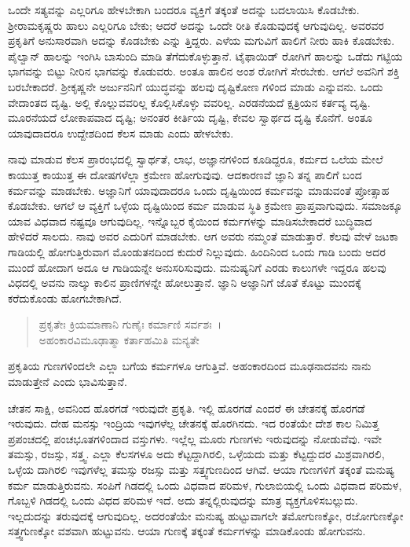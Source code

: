 ಒಂದೇ ಸತ್ಯವನ್ನು ಎಲ್ಲರಿಗೂ ಹೇಳಬೇಕಾಗಿ ಬಂದರೂ ವ್ಯಕ್ತಿಗೆ ತಕ್ಕಂತೆ ಅದನ್ನು ಬದಲಾಯಿಸಿ ಕೊಡಬೇಕು. ಶ‍್ರೀರಾಮಕೃಷ್ಣರು ಹಾಲು ಎಲ್ಲರಿಗೂ ಬೇಕು; ಆದರೆ ಅದನ್ನು ಒಂದೇ ರೀತಿ ಕೊಡುವುದಕ್ಕೆ ಆಗುವುದಿಲ್ಲ. ಅವರವರ ಪ್ರಕೃತಿಗೆ ಅನುಸಾರವಾಗಿ ಅದನ್ನು ಕೊಡಬೇಕು ಎನ್ನು ತ್ತಿದ್ದರು. ಎಳೆಯ ಮಗುವಿಗೆ ಹಾಲಿಗೆ ನೀರು ಹಾಕಿ ಕೊಡಬೇಕು. ಪೈಲ್ವಾನ್ ಹಾಲನ್ನು ಇಂಗಿಸಿ ಬಾಸುಂದಿ ಮಾಡಿ ತೆಗೆದುಕೊಳ್ಳುತ್ತಾನೆ. ಟೈಫಾಯಿಡ್ ರೋಗಿಗೆ ಹಾಲನ್ನು ಒಡೆದು ಗಟ್ಟಿಯ ಭಾಗವನ್ನು ಬಿಟ್ಟು ನೀರಿನ ಭಾಗವನ್ನು ಕೊಡುವರು. ಅಂತೂ ಹಾಲಿನ ಅಂಶ ರೋಗಿಗೆ ಸೇರಬೇಕು. ಆಗಲೆ ಅವನಿಗೆ ಶಕ್ತಿ ಬರಬೇಕಾದರೆ. ಶ‍್ರೀಕೃಷ್ಣನೇ ಅರ್ಜುನನಿಗೆ ಯುದ್ಧವನ್ನು ಹಲವು ದೃಷ್ಟಿಕೋಣ ಗಳಿಂದ ಮಾಡು ಎನ್ನುವನು. ಒಂದು ವೇದಾಂತದ ದೃಷ್ಟಿ. ಅಲ್ಲಿ ಕೊಲ್ಲುವವರಿಲ್ಲ ಕೊಲ್ಲಿಸಿಕೊಳ್ಳು ವವರಿಲ್ಲ. ಎರಡನೆಯದೆ ಕ್ಷತ್ರಿಯನ ಕರ್ತವ್ಯ ದೃಷ್ಟಿ. ಮೂರನೆಯದೆ ಲೋಕಾಪವಾದ ದೃಷ್ಟಿ; ಅನಂತರ ಕೀರ್ತಿಯ ದೃಷ್ಟಿ, ಕೇವಲ ಸ್ವಾರ್ಥದ ದೃಷ್ಟಿ ಕೊನೆಗೆ. ಅಂತೂ ಯಾವುದಾದರೂ ಉದ್ದೇಶದಿಂದ ಕೆಲಸ ಮಾಡು ಎಂದು ಹೇಳಬೇಕು.

ನಾವು ಮಾಡುವ ಕೆಲಸ ಪ್ರಾರಂಭದಲ್ಲಿ ಸ್ವಾರ್ಥತೆ, ಲಾಭ, ಅಜ್ಞಾನಗಳಿಂದ ಕೂಡಿದ್ದರೂ, ಕರ್ಮದ ಒಲೆಯ ಮೇಲೆ ಕಾಯುತ್ತ ಕಾಯುತ್ತ ಈ ದೋಷಗಳೆಲ್ಲಾ ಕ್ರಮೇಣ ಹೋಗುವುವು. ಆದಕಾರಣವೆ ಜ್ಞಾನಿ ತನ್ನ ಪಾಲಿಗೆ ಬಂದ ಕರ್ಮವನ್ನು ಮಾಡಬೇಕು. ಅಜ್ಞಾನಿಗೆ ಯಾವುದಾದರೂ ಒಂದು ದೃಷ್ಟಿಯಿಂದ ಕರ್ಮವನ್ನು ಮಾಡುವಂತೆ ಪ್ರೋತ್ಸಾಹ ಕೊಡಬೇಕು. ಆಗಲೆ ಆ ವ್ಯಕ್ತಿಗೆ ಒಳ್ಳೆಯ ದೃಷ್ಟಿಯಿಂದ ಕರ್ಮ ಮಾಡುವ ಸ್ಥಿತಿ ಕ್ರಮೇಣ ಪ್ರಾಪ್ತವಾಗುವುದು. ಸಮಾಜಕ್ಕೂ ಯಾವ ವಿಧವಾದ ನಷ್ಟವೂ ಆಗುವುದಿಲ್ಲ. ಇನ್ನೊಬ್ಬರ ಕೈಯಿಂದ ಕರ್ಮಗಳನ್ನು ಮಾಡಿಸಬೇಕಾದರೆ ಬುದ್ಧಿವಾದ ಹೇಳಿದರೆ ಸಾಲದು. ನಾವು ಅವರ ಎದುರಿಗೆ ಮಾಡಬೇಕು. ಆಗ ಅವರು ನಮ್ಮಂತೆ ಮಾಡುತ್ತಾರೆ. ಕೆಲವು ವೇಳೆ ಜಟಕಾ ಗಾಡಿಯಲ್ಲಿ ಹೋಗುತ್ತಿರುವಾಗ ಮೊಂಡುತನದಿಂದ ಕುದುರೆ ನಿಲ್ಲುವುದು. ಹಿಂದಿನಿಂದ ಒಂದು ಗಾಡಿ ಬಂದು ಅದರ ಮುಂದೆ ಹೋದಾಗ ಅದೂ ಆ ಗಾಡಿಯನ್ನೇ ಅನುಸರಿಸುವುದು. ಮನುಷ್ಯನಿಗೆ ಎರಡು ಕಾಲುಗಳೇ ಇದ್ದರೂ ಹಲವು ವಿಧದಲ್ಲಿ ಅವನು ನಾಲ್ಕು ಕಾಲಿನ ಪ್ರಾಣಿಗಳನ್ನೇ ಹೋಲುತ್ತಾನೆ. ಜ್ಞಾನಿ ಅಜ್ಞಾನಿಗೆ ಜೊತೆ ಕೊಟ್ಟು ಮುಂದಕ್ಕೆ ಕರೆದುಕೊಂಡು ಹೋಗಬೇಕಾಗಿದೆ.

\begin{verse}
ಪ್ರಕೃತೇಃ ಕ್ರಿಯಮಾಣಾನಿ ಗುಣೈಃ ಕರ್ಮಾಣಿ ಸರ್ವಶಃ~।\\ಅಹಂಕಾರವಿಮೂಢಾತ್ಮಾ ಕರ್ತಾಹಮಿತಿ ಮನ್ಯತೇ 
\end{verse}

{\small ಪ್ರಕೃತಿಯ ಗುಣಗಳಿಂದಲೇ ಎಲ್ಲಾ ಬಗೆಯ ಕರ್ಮಗಳೂ ಆಗುತ್ತಿವೆ. ಅಹಂಕಾರದಿಂದ ಮೂಢನಾದವನು ನಾನು ಮಾಡುತ್ತೇನೆ ಎಂದು ಭಾವಿಸುತ್ತಾನೆ.}

ಚೇತನ ಸಾಕ್ಷಿ, ಅವನಿಂದ ಹೊರಗಡೆ ಇರುವುದೇ ಪ್ರಕೃತಿ. ಇಲ್ಲಿ ಹೊರಗಡೆ ಎಂದರೆ ಈ ಚೇತನಕ್ಕೆ ಹೊರಗಡೆ ಇರುವುದು. ದೇಹ ಮನಸ್ಸು ಇಂದ್ರಿಯ ಇವುಗಳೆಲ್ಲ ಚೇತನಕ್ಕೆ ಹೊರಗಿನದು. ಇದ ರಂತೆಯೇ ದೇಶ ಕಾಲ ನಿಮಿತ್ತ ಪ್ರಪಂಚದಲ್ಲಿ ಪಂಚಭೂತಗಳಿಂದಾದ ವಸ್ತುಗಳು. ಇಲ್ಲೆಲ್ಲ ಮೂರು ಗುಣಗಳು ಇರುವುದನ್ನು ನೋಡುವೆವು. ಇವೇ ತಮಸ್ಸು, ರಜಸ್ಸು, ಸತ್ತ್ವ. ಎಲ್ಲಾ ಕೆಲಸಗಳೂ ಅದು ಕೆಟ್ಟದ್ದಾಗಿರಲಿ, ಒಳ್ಳೆಯದು ಮತ್ತು ಕೆಟ್ಟದ್ದುದರ ಮಿಶ್ರವಾಗಿರಲಿ, ಒಳ್ಳೆಯ ದಾಗಿರಲಿ ಇವುಗಳೆಲ್ಲ ತಮಸ್ಸು ರಜಸ್ಸು ಮತ್ತು ಸತ್ತ್ವಗುಣದಿಂದ ಆಗಿವೆ. ಆಯಾ ಗುಣಗಳಿಗೆ ತಕ್ಕಂತೆ ಮನುಷ್ಯ ಕರ್ಮ ಮಾಡುತ್ತಿರುವನು. ಸಂಪಿಗೆ ಗಿಡದಲ್ಲಿ ಒಂದು ವಿಧವಾದ ಪರಿಮಳ, ಗುಲಾಬಿಯಲ್ಲಿ ಒಂದು ವಿಧವಾದ ಪರಿಮಳ, ಗೊಬ್ಬಳಿ ಗಿಡದಲ್ಲಿ ಒಂದು ವಿಧದ ಪರಿಮಳ ಇದೆ. ಅದು ತನ್ನಲ್ಲಿರುವುದನ್ನು ಮಾತ್ರ ವ್ಯಕ್ತಗೊಳಿಸಬಲ್ಲುದು. ಇಲ್ಲದುದನ್ನು ತರುವುದಕ್ಕೆ ಆಗುವುದಿಲ್ಲ. ಅದರಂತೆಯೇ ಮನುಷ್ಯ ಹುಟ್ಟುವಾಗಲೇ ತಮೋಗುಣಕ್ಕೋ, ರಜೋಗುಣಕ್ಕೋ ಸತ್ತ್ವಗುಣಕ್ಕೋ ವಶವಾಗಿ ಹುಟ್ಟುವನು. ಆಯಾ ಗುಣಕ್ಕೆ ತಕ್ಕಂತೆ ಕರ್ಮಗಳನ್ನು ಮಾಡಿಕೊಂಡು ಹೋಗುವನು.

